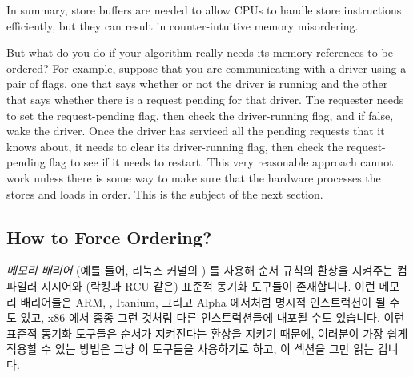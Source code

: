 In summary, store buffers are needed to allow CPUs to handle
store instructions efficiently, but they can result in
counter-intuitive memory misordering.

But what do you do if your algorithm really needs its memory
references to be ordered?
For example, suppose that you are communicating with a driver using
a pair of flags, one that says whether or not the driver is running
and the other that says whether there is a request pending for that
driver.
The requester needs to set the request-pending flag, then check
the driver-running flag, and if false, wake the driver.
Once the driver has serviced all the pending requests that it knows about,
it needs to clear its driver-running flag, then check the request-pending
flag to see if it needs to restart.
This very reasonable approach cannot work unless there is some way
to make sure that the hardware processes the stores and loads in order.
This is the subject of the next section.
\fi

\subsection{How to Force Ordering?}
\label{sec:memorder:How to Force Ordering?}

\emph{메모리 배리어} (예를 들어, 리눅스 커널의 ) 를 사용해 순서
규칙의 환상을 지켜주는 컴파일러 지시어와 (락킹과 RCU 같은) 표준적 동기화
도구들이 존재합니다.
이런 메모리 배리어들은 ARM, \Power{}, Itanium, 그리고 Alpha 에서처럼 명시적
인스트럭션이 될 수도 있고, x86 에서 종종 그런 것처럼 다른 인스트럭션들에 내포될
수도 있습니다.
이런 표준적 동기화 도구들은 순서가 지켜진다는 환상을 지키기 때문에, 여러분이
가장 쉽게 적용할 수 있는 방법은 그냥 이 도구들을 사용하기로 하고, 이 섹션을
그만 읽는 겁니다.


